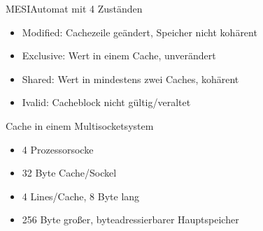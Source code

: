 \documentclass[
  german,            %
  aspectratio=169,    %
  sectionpage=false,   %
]{tumbeamer}
\begin{document}
\begin{frame}{MESI}{Automat mit 4 Zuständen}
  \begin{itemize}
    \item Modified: Cachezeile geändert, Speicher nicht kohärent
    \item Exclusive: Wert in einem Cache, unverändert
    \item Shared: Wert in mindestens zwei Caches, kohärent
    \item Ivalid: Cacheblock nicht gültig/veraltet
  \end{itemize}
  
\end{frame}
\begin{frame}{Cache in einem Multisocketsystem}
  \begin{itemize}
    \item 4 Prozessorsocke
    \item 32 Byte Cache/Sockel
    \item 4 Lines/Cache, 8 Byte lang
    \item 256 Byte großer, byteadressierbarer Hauptspeicher
  \end{itemize}
\end{frame}
\end{document}
